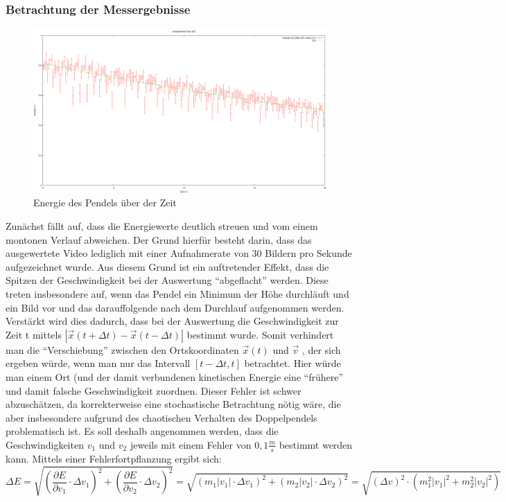 \subsubsection{Betrachtung der Messergebnisse}

\begin{figure}
        \includegraphics[width=.9\textwidth]{images/E_ueber_t.png}
\caption{Energie des Pendels über der Zeit}
\label{E_ueber_t}
\end{figure}


Zunächst fällt auf, dass die Energiewerte deutlich streuen und vom einem montonen Verlauf abweichen. Der Grund hierfür besteht darin, dass das ausgewertete Video lediglich mit einer Aufnahmerate von 30 Bildern pro Sekunde aufgezeichnet wurde. Aus diesem Grund ist ein auftretender Effekt, dass die Spitzen der Geschwindigkeit bei der Auswertung \enquote{abgeflacht} werden. Diese treten insbesondere auf, wenn das Pendel ein Minimum der Höhe durchläuft und ein Bild vor und das darauffolgende nach dem Durchlauf aufgenommen werden. Verstärkt wird dies dadurch, dass bei der Auswertung die Geschwindigkeit zur Zeit t mittels $ |\vec{x}(t+\Delta t) - \vec{x}(t-\Delta t)| $ bestimmt wurde. Somit verhindert man die \enquote{Verschiebung} zwischen den Ortskoordinaten $  \vec{x} (t) $ und $ \vec{v} $ , der sich ergeben würde, wenn man nur das Intervall $ [t - \Delta t, t] $ betrachtet. Hier würde man einem Ort (und der damit verbundenen kinetischen Energie eine \enquote{frühere} und damit falsche Geschwindigkeit zuordnen. 
Dieser Fehler ist schwer abzuschätzen, da korrekterweise eine stochastische Betrachtung nötig wäre, die aber insbesondere aufgrund des chaotischen Verhalten des Doppelpendels problematisch ist. 
Es soll deshalb angenommen werden, dass die Geschwindigkeiten $ v_1 $ und $ v_2 $ jeweils mit einem Fehler von $ 0,1 \frac{m}{s} $ bestimmt werden kann. Mittels einer Fehlerfortpflanzung ergibt sich: 
\footnotesize
\begin{equation}
\Delta E = \sqrt{(\frac{\partial E}{\partial v_1} \cdot \Delta v_1)^2 + (\frac{\partial E}{\partial v_2} \cdot \Delta v_2)^2} = \sqrt{(m_1 |v_1| \cdot \Delta v_1)^2 + (m_2 |v_2| \cdot \Delta v_2)^2} = \sqrt{(\Delta v)^2 \cdot (m_1^2 |v_1|^2 + m_2^2 |v_2|^2)}
\end{equation}
\normalsize \\

